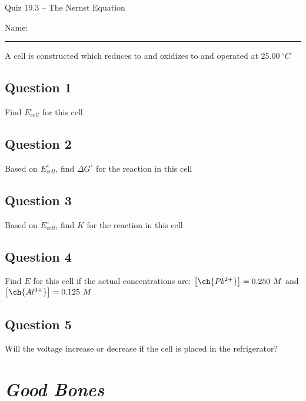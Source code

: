 \documentclass[11pt, letterpaper]{memoir}
\begin{document}
	\begin{center}
		{\large	Quiz 19.3 -- The Nernst Equation}
	\end{center}
	{\large Name: \rule[-1mm]{4in}{.1pt} 

\noindent
A cell is constructed which reduces  to  and oxidizes  to  and operated at $25.00~^\circ C$

\subsection*{Question 1}
Find $E^\circ_{cell}$ for this cell

\vspace{2em}
\subsection*{Question 2}
Based on $E^\circ_{cell}$, find $\Delta G^\circ$ for the reaction in this cell

\vspace{6em}
\subsection*{Question 3}
Based on $E^\circ_{cell}$, find $K$ for the reaction in this cell

\vspace{6em}
\subsection*{Question 4}
Find $E$ for this cell if the actual concentrations are: $\left[\ch{Pb^{2+}}\right] = 0.250~M$ and $\left[\ch{Al^{3+}}\right] = 0.125~M$

\vspace{8em}
\subsection*{Question 5}
Will the voltage increase or decrease if the cell is placed in the refrigerator?
	\newpage
	\pagestyle{empty}
	\addtocounter{page}{-1}
\section*{\emph{Good Bones}}
}
\end{document}
